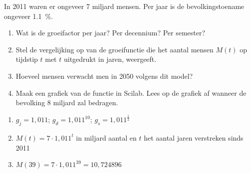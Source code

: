 \begin{oef}
  In 2011 waren er ongeveer 7 miljard mensen. Per jaar is
      de bevolkingstoename ongeveer \SI{1,1}{\percent}.
      \begin{enumerate}
          \item  Wat is de groeifactor per jaar? Per decennium? Per semester?
          
          \item Stel de vergelijking op van de groeifunctie die het aantal mensen $M(t)$ op tijdstip $t$ met $t$ uitgedrukt in jaren, weergeeft. 
          
          \item  Hoeveel mensen verwacht men in 2050 volgens dit model?

          \item Maak een grafiek van de functie in Scilab. Lees op de grafiek af wanneer  de bevolking 8 miljard zal bedragen.

      \end{enumerate}
      \begin{opl}
      \begin{enumerate}
      \item $g_j=1,011$; $g_d=1,011^{10}$; $g_s=1,011^\frac{1}{2}$
      \item $M(t)=7\cdot 1,011^t$ in miljard aantal en $t$ het aantal jaren verstreken sinds 2011
      \item $M(39)=7\cdot 1,011^{39}=10,724896$
      \end{enumerate}
      \end{opl}

      \end{oef}



